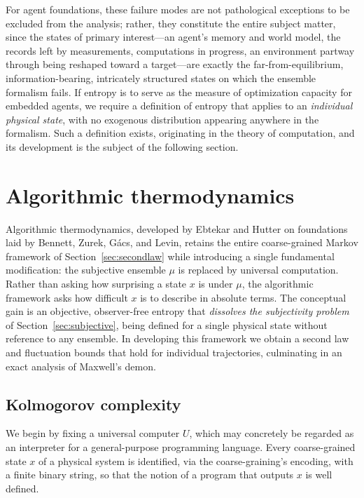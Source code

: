 \documentclass[10pt]{article}
\theoremstyle{definition}
\theoremstyle{remark}
\begin{document}
For agent foundations, these failure modes are not pathological exceptions to be excluded from the analysis; rather, they constitute the entire subject matter, since the states of primary interest---an agent's memory and world model, the records left by measurements, computations in progress, an environment partway through being reshaped toward a target---are exactly the far-from-equilibrium, information-bearing, intricately structured states on which the ensemble formalism fails. If entropy is to serve as the measure of optimization capacity for embedded agents, we require a definition of entropy that applies to an \emph{individual physical state}, with no exogenous distribution appearing anywhere in the formalism. Such a definition exists, originating in the theory of computation, and its development is the subject of the following section.
\section{Algorithmic thermodynamics}
\label{sec:algo}

Algorithmic thermodynamics, developed by Ebtekar and Hutter on foundations laid by Bennett, Zurek, G\'acs, and Levin, retains the entire coarse-grained Markov framework of Section~\ref{sec:secondlaw} while introducing a single fundamental modification: the subjective ensemble $\mu$ is replaced by universal computation. Rather than asking how surprising a state $x$ is under $\mu$, the algorithmic framework asks how difficult $x$ is to describe in absolute terms. The conceptual gain is an objective, observer-free entropy that \emph{dissolves the subjectivity problem} of Section~\ref{sec:subjective}, being defined for a single physical state without reference to any ensemble. In developing this framework we obtain a second law and fluctuation bounds that hold for individual trajectories, culminating in an exact analysis of Maxwell's demon.

\subsection{Kolmogorov complexity}
\label{sec:kolmogorov}

We begin by fixing a universal computer $U$, which may concretely be regarded as an interpreter for a general-purpose programming language. Every coarse-grained state $x$ of a physical system is identified, via the coarse-graining's encoding, with a finite binary string, so that the notion of a program that outputs $x$ is well defined.
\end{document}
